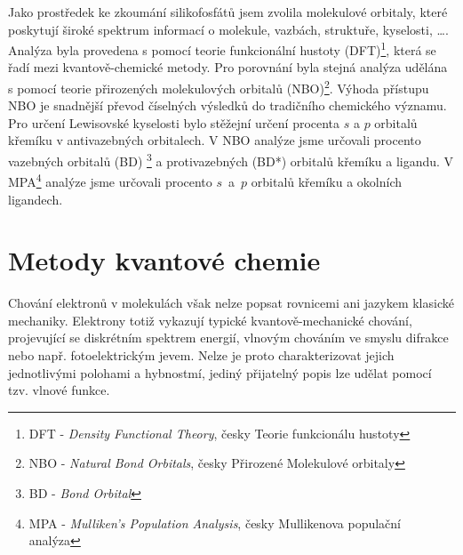 \documentclass[
digital, %
table,   %
lof,     %
lot,     %
oneside,
]{fithesis3}
\begin{document}
Jako prostředek ke zkoumání silikofosfátů jsem zvolila molekulové orbitaly, které poskytují široké spektrum informací o molekule, vazbách, struktuře, kyselosti, \dots.  Analýza byla provedena s pomocí teorie funkcionální hustoty (DFT)\footnote{DFT - \textit{Density Functional Theory}, česky Teorie funkcionálu hustoty}, která se řadí mezi kvantově-chemické metody. Pro porovnání byla stejná analýza udělána s pomocí teorie přirozených molekulových orbitalů (NBO)\footnote{NBO - \textit{Natural Bond Orbitals}, česky Přirozené Molekulové orbitaly}. Výhoda přístupu NBO je snadnější převod číselných výsledků do tradičního chemického významu. Pro určení Lewisovské kyselosti bylo stěžejní určení procenta $s$ a $p$ orbitalů křemíku v antivazebných orbitalech.  V NBO analýze jsme určovali procento vazebných orbitalů (BD) \footnote{BD - \textit{Bond Orbital}} a protivazebných (BD*) orbitalů křemíku a ligandu. V MPA\footnote{MPA - \textit{Mulliken's Population Analysis}, česky Mullikenova populační analýza} analýze jsme určovali procento $s$~a~$p$ orbitalů křemíku a okolních ligandech.
\newpage

\chapter{Metody kvantové chemie}
Chování elektronů v molekulách však nelze popsat rovnicemi ani jazykem klasické mechaniky. Elektrony totiž vykazují typické kvantově-mechanické chování, projevující se diskrétním spektrem energií, vlnovým chováním ve smyslu difrakce nebo např. fotoelektrickým jevem. Nelze je proto charakterizovat jejich jednotlivými polohami a hybnostmí, jediný přijatelný popis lze udělat pomocí tzv. vlnové funkce.
\end{document}
